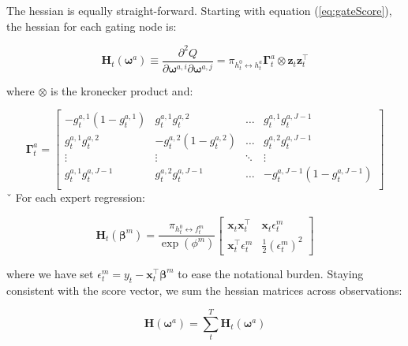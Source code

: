 \documentclass[12pt]{article}
\newcommand{\bw}[1]{\boldsymbol{\omega}^{#1}}
\newcommand{\Ht}[1]{\mathbf{H}_{t}(#1)}
\newcommand{\HH}[1]{\boldsymbol{H}(#1)}
\newcommand{\gateprod}[2]{\pi_{#1 \longleftrightarrow #2}}
\begin{document}
The hessian is equally straight-forward. Starting with equation
(\ref{eq:gateScore}), the hessian for each gating node is:


\begin{equation} \label{eq:nodehessian}
  \Ht{\bw{a}} \equiv \frac{\partial^{2} Q}{\partial \boldsymbol{\omega}^{a,i} \partial \boldsymbol{\omega}^{a,j}} = \gateprod{h^{0}_{t}}{h^{a}_{t}} \boldsymbol{\Gamma}^{a}_{t} \otimes  \boldsymbol{z}_{t} \boldsymbol{z}_{t}^\top
\end{equation}

where $\otimes$ is the kronecker product and:

\begin{equation}
  \boldsymbol{\Gamma}^{a}_{t} = \begin{bmatrix}
  -g_{t}^{a,1}(1-g_{t}^{a,1}) & g_{t}^{a,1}g_{t}^{a,2}      & \dots  & g_{t}^{a,1}g_{t}^{a,J-1}        \\
  g_{t}^{a,1}g_{t}^{a,2}      & -g_{t}^{a,2}(1-g_{t}^{a,2}) & \dots  & g_{t}^{a,2}g_{t}^{a,J-1}        \\
  \vdots                      &  \vdots                     & \ddots & \vdots                          \\
  g_{t}^{a,1}g_{t}^{a,J-1}    & g_{t}^{a,2}g_{t}^{a,J-1}    & \dots  & -g_{t}^{a,J-1}(1-g_{t}^{a,J-1}) \\
    \end{bmatrix}
\end{equation}
ˇ
For each expert regression:


\begin{equation}
  \Ht{\boldsymbol{\beta}^{m}} = \frac{\gateprod{h^{0}_{t}}{f^{m}_{t}}}{\exp{(\phi^{m})}} \begin{bmatrix}
  \boldsymbol{x}_{t} \boldsymbol{x}^{\top}_{t}     &  \boldsymbol{x}_{t} \epsilon^{m}_{t}     \\
  \boldsymbol{x}^{\top}_{t} \epsilon^{m}_{t}       &  \frac{1}{2} (\epsilon^{m}_{t})^{2}
    \end{bmatrix}
\end{equation}

where we have set $\epsilon^{m}_{t} = y_{t} - \boldsymbol{x}^{\top}_{t} \boldsymbol{\beta}^{m}$
to ease the notational burden. Staying consistent with the score vector, we
sum the hessian matrices across observations:

\begin{equation}
  \HH{\boldsymbol{\omega}^{a}} = \sum_{t}^{T} \Ht{\boldsymbol{\omega}^{a}}
\end{equation}
\end{document}

